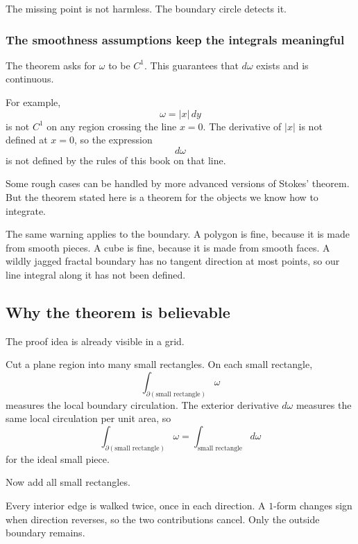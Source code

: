 The missing point is not harmless.  The boundary circle detects it.

\subsubsection*{The smoothness assumptions keep the integrals meaningful}

The theorem asks for \(\omega\) to be \(C^1\).  This guarantees that \(d\omega\) exists
and is continuous.

For example,
\[
    \omega=|x|\,dy
\]
is not \(C^1\) on any region crossing the line \(x=0\).  The derivative of \(|x|\) is not
defined at \(x=0\), so the expression
\[
    d\omega
\]
is not defined by the rules of this book on that line.

Some rough cases can be handled by more advanced versions of Stokes' theorem.  But
the theorem stated here is a theorem for the objects we know how to integrate.

The same warning applies to the boundary.  A polygon is fine, because it is made from
smooth pieces.  A cube is fine, because it is made from smooth faces.  A wildly jagged
fractal boundary has no tangent direction at most points, so our line integral along it
has not been defined.

\subsection{Why the theorem is believable}

The proof idea is already visible in a grid.

Cut a plane region into many small rectangles.  On each small rectangle,
\[
    \int_{\partial(\text{small rectangle})}\omega
\]
measures the local boundary circulation.  The exterior derivative \(d\omega\) measures
the same local circulation per unit area, so
\[
    \int_{\partial(\text{small rectangle})}\omega
    =
    \int_{\text{small rectangle}}d\omega
\]
for the ideal small piece.

Now add all small rectangles.

Every interior edge is walked twice, once in each direction.  A \(1\)-form changes sign
when direction reverses, so the two contributions cancel.  Only the outside boundary
remains.


